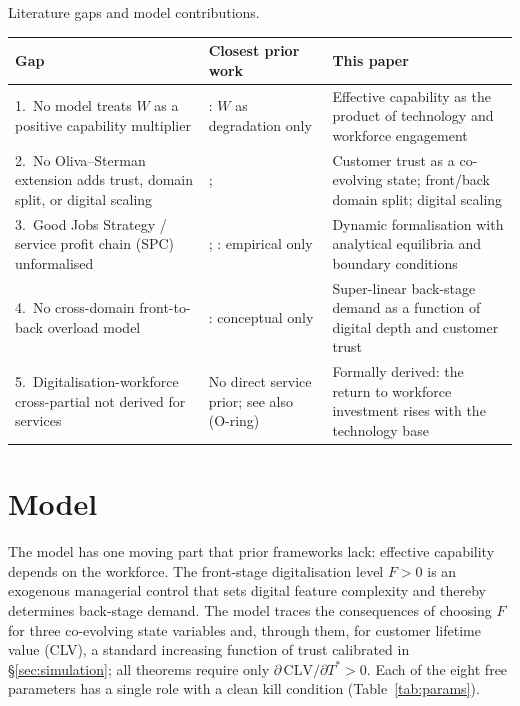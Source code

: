 \documentclass[msom,dblanonrev]{informs4}
\begin{document}
\begin{table}
\TABLE
{Literature gaps and model contributions.\label{tab:gaps}}
{\begin{tabular}{@{}p{}p{}p{}@{}}
\toprule
\textbf{Gap} & \textbf{Closest prior work} & \textbf{This paper} \\
\midrule
1.\ No model treats $W$ as a positive capability multiplier &
    \citet{oliva2001cutting}: $W$ as degradation only &
    Effective capability as the product of technology and workforce engagement \\[6pt]
2.\ No Oliva--Sterman extension adds trust, domain split, or digital scaling &
    \citet{oliva2001cutting}; \citet{martinez2014drift} &
    Customer trust as a co-evolving state; front/back domain split; digital scaling \\[6pt]
3.\ Good Jobs Strategy / service profit chain (SPC) unformalised &
    \citet{ton2014good}; \citet{heskett1994putting}: empirical only &
    Dynamic formalisation with analytical equilibria and boundary conditions \\[6pt]
4.\ No cross-domain front-to-back overload model &
    \citet{saghiri2017toward}: conceptual only &
    Super-linear back-stage demand as a function of digital depth and customer trust \\[6pt]
5.\ Digitalisation-workforce cross-partial not derived for services &
    No direct service prior; see also \citet{gans2026oring} (O-ring) &
    Formally derived: the return to workforce investment rises with the technology base \\
\bottomrule
\end{tabular}}{}\end{table}

\section{Model}\label{sec:model}

The model has one moving part that prior frameworks lack: effective capability depends on the workforce. The front-stage digitalisation level $F > 0$ is an exogenous managerial control that sets digital feature complexity and thereby determines back-stage demand. The model traces the consequences of choosing $F$ for three co-evolving state variables and, through them, for customer lifetime value (CLV), a standard increasing function of trust calibrated in \S\ref{sec:simulation}; all theorems require only $\partial\,\mathrm{CLV}/\partial T^* > 0$. Each of the eight free parameters has a single role with a clean kill condition (Table~\ref{tab:params}).
\end{document}

